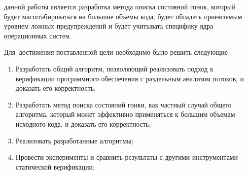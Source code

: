 

%
%


{\aim} данной работы является разработка метода поиска состояний гонок, который будет масштабироваться на большие объемы кода, будет обладать приемлемым уровнем ложных предупреждений и будет учитывать специфику ядра операционных систем.

Для~достижения поставленной цели необходимо было решить следующие {\tasks}:
\begin{enumerate}
  \item Разработать общий алгоритм, позволяющий реализовать подход к верификации программного обеспечения с раздельным анализом потоков, и доказать его корректность;
  \item Разработать метод поиска состояний гонки, как частный случай общего алгоритма, который может эффективно применяться к большим объемам исходного кода, и доказать его корректность;
  \item Реализовать разработанные алгоритмы;
  \item Провести эксперименты и сравнить результаты с другими инструментами статической верификации;
\end{enumerate}

